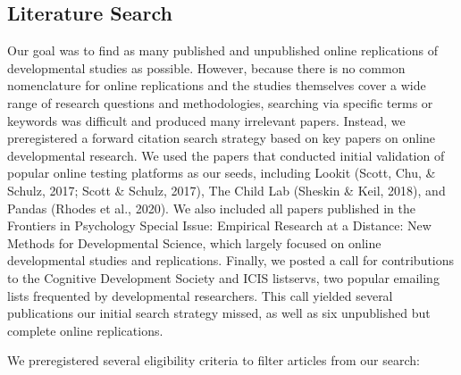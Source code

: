 \documentclass[
  man,floatsintext]{apa6}
\begin{document}
\hypertarget{literature-search}{%
\subsection{Literature Search}\label{literature-search}}

Our goal was to find as many published and unpublished online replications of developmental studies as possible. However, because there is no common nomenclature for online replications and the studies themselves cover a wide range of research questions and methodologies, searching via specific terms or keywords was difficult and produced many irrelevant papers. Instead, we preregistered a forward citation search strategy based on key papers on online developmental research. We used the papers that conducted initial validation of popular online testing platforms as our seeds, including Lookit (Scott, Chu, \& Schulz, 2017; Scott \& Schulz, 2017), The Child Lab (Sheskin \& Keil, 2018), and Pandas (Rhodes et al., 2020). We also included all papers published in the Frontiers in Psychology Special Issue: Empirical Research at a Distance: New Methods for Developmental Science, which largely focused on online developmental studies and replications. Finally, we posted a call for contributions to the Cognitive Development Society and ICIS listservs, two popular emailing lists frequented by developmental researchers. This call yielded several publications our initial search strategy missed, as well as six unpublished but complete online replications.

We preregistered several eligibility criteria to filter articles from our search:
\end{document}
